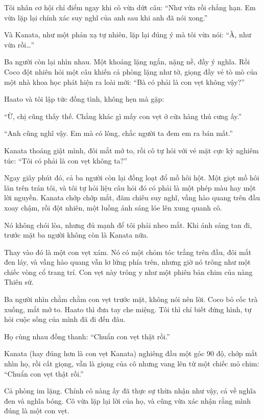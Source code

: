 \documentclass[../main.tex]{subfiles}
\begin{document}
Tôi nhân cơ hội chỉ điểm ngay khi cô vừa dứt câu: ``Như vừa rồi chẳng hạn. Em vừa lặp lại chính xác suy nghĩ của anh sau khi anh đã nói xong.''

Và Kanata, như một phản xạ tự nhiên, lặp lại đúng ý mà tôi vừa nói: ``À, như vừa rồi\dots''

Ba người còn lại nhìn nhau. Một khoảng lặng ngắn, nặng nề, đầy ý nghĩa. Rồi Coco đột nhiên hỏi một câu khiến cả phòng lặng như tờ, giọng đầy vẻ tò mò của một nhà khoa học phát hiện ra loài mới: ``Bà có phải là con vẹt không vậy?''

Haato và tôi lập tức đồng tình, không hẹn mà gặp:

``Ừ, chị cũng thấy thế. Chẳng khác gì mấy con vẹt ở cửa hàng thú cưng ấy.''

``Anh cũng nghĩ vậy. Em mà có lông, chắc người ta đem em ra bán mất.''

Kanata thoáng giật mình, đôi mắt mở to, rồi cô tự hỏi với vẻ mặt cực kỳ nghiêm túc: ``Tôi có phải là con vẹt không ta?''

Ngay giây phút đó, cả ba người còn lại đồng loạt đổ mồ hôi hột. Một giọt mồ hôi lăn trên trán tôi, và tôi tự hỏi liệu câu hỏi đó có phải là một phép màu hay một lời nguyền. Kanata chớp chớp mắt, đăm chiêu suy nghĩ, vầng hào quang trên đầu xoay chậm, rồi đột nhiên, một luồng ánh sáng lóe lên xung quanh cô.

Nó không chói lòa, nhưng đủ mạnh để tôi phải nheo mắt. Khi ánh sáng tan đi, trước mặt ba người không còn là Kanata nữa.

Thay vào đó là một con vẹt xám. Nó có một chỏm tóc trắng trên đầu, đôi mắt đen láy, và vầng hào quang vẫn lơ lửng phía trên, nhưng giờ nó trông như một chiếc vòng cổ trang trí. Con vẹt này trông y như một phiên bản chim của nàng Thiên sứ.


Ba người nhìn chằm chằm con vẹt trước mặt, không nói nên lời. Coco bỏ cốc trà xuống, mắt mở to. Haato thì đưa tay che miệng. Tôi thì chỉ biết đứng hình, tự hỏi cuộc sống của mình đã đi đến đâu.

Họ cùng nhau đồng thanh: ``Chuẩn con vẹt thật rồi.''

Kanata (hay đúng hơn là con vẹt Kanata) nghiêng đầu một góc 90 độ, chớp mắt nhìn họ, rồi cất giọng, vẫn là giọng của cô nhưng vang lên từ một chiếc mỏ chim: ``Chuẩn con vẹt thật rồi.''

Cả phòng im lặng. Chính cô nàng ấy đã thực sự thừa nhận như vậy, cả về nghĩa đen và nghĩa bóng. Cô vừa lặp lại lời của họ, và cũng vừa xác nhận rằng mình đúng là một con vẹt.
\end{document}
